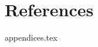 \documentclass[a4paper,11pt]{article}
\begin{document}
\section{References}
\renewcommand{\refname}{} %


\newpage
\begin{appendices}
    \captionsetup[figure]{list=no}
    \captionsetup[table]{list=no}
    {appendices.tex}%
\end{appendices}
\end{document}
